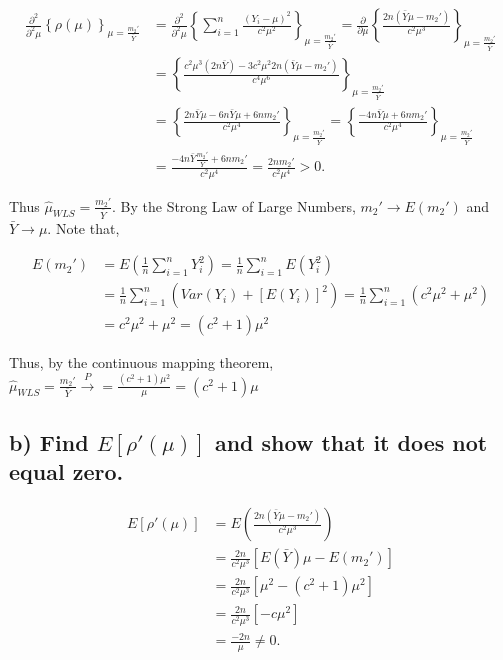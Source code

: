 \documentclass[
  letterpaper,
  DIV=11,
  numbers=noendperiod]{scrreprt}
\begin{document}
\[
\begin{aligned}
\frac{\partial^2}{\partial^2 \mu} \left\{\rho(\mu)\right\}_{\mu=\frac{m_2'}{\bar{Y}}} &= \frac{\partial^2 }{\partial^2 \mu} \left\{ \sum_{i=1}^n \frac{(Y_i- \mu)^2}{c^2\mu^2} \right\}_{\mu = \frac{m_2'}{\bar{Y}}} 
=\frac{\partial}{\partial \mu} \left\{ \frac{2n(\bar{Y}\mu -m_2')}{c^2\mu^3} \right\}_{\mu = \frac{m_2'}{\bar{Y}}} \\
&=\left\{ \frac{c^2\mu^3(2n\bar{Y})-3c^2\mu^2 2n(\bar{Y}\mu -m_2')}{c^4\mu^6} \right\}_{\mu = \frac{m_2'}{\bar{Y}}} \\
&=\left\{ \frac{2n\bar{Y}\mu-6n\bar{Y}\mu +6nm_2'}{c^2\mu^4} \right\}_{\mu = \frac{m_2'}{\bar{Y}}} 
=\left\{ \frac{-4n\bar{Y}\mu+6nm_2'}{c^2\mu^4} \right\}_{\mu = \frac{m_2'}{\bar{Y}}} \\
&=\frac{-4n\bar{Y}\frac{m_2'}{\bar{Y}}+6nm_2'}{c^2\mu^4} =\frac{2nm_2'}{c^2\mu^4}
> 0.
\end{aligned}
\]

Thus \(\hat{\mu}_{WLS} = \frac{m_2'}{\bar{Y}}\). By the Strong Law of
Large Numbers, \(m_2' \to E(m_2')\) and \(\bar{Y} \to \mu\). Note that,

\[
\begin{aligned}E(m_2') &= E\left(\frac{1}{n}\sum_{i=1}^n Y_i^2\right)=\frac{1}{n}\sum_{i=1}^nE\left( Y_i^2\right) \\ &=\frac{1}{n}\sum_{i=1}^n \left(Var(Y_i) +[E(Y_i)]^2 \right) =\frac{1}{n}\sum_{i=1}^n \left( c^2\mu^2+\mu^2 \right)\\
&=c^2\mu^2+\mu^2 = (c^2+1)\mu^2
\end{aligned}
\]

Thus, by the continuous mapping theorem,
\(\hat{\mu}_{WLS}= \frac{m_2'}{\bar{Y}} \overset{P}{\to} = \frac{(c^2+1)\mu^2}{\mu}=(c^2+1)\mu\)

\hypertarget{b-find-erho-mu-and-show-that-it-does-not-equal-zero.}{%
\subsection{\texorpdfstring{b) Find \(E[\rho ' (\mu)]\) and show that it
does not equal
zero.}{b) Find E{[}\textbackslash rho \textquotesingle{} (\textbackslash mu){]} and show that it does not equal zero.}}\label{b-find-erho-mu-and-show-that-it-does-not-equal-zero.}}

\[
\begin{aligned}
E[\rho ' (\mu)] &= E\left(\frac{2n(\bar{Y}\mu -m_2')}{c^2\mu^3} \right) \\
&= \frac{2n}{c^2\mu^3}\left[E(\bar{Y})\mu -E(m_2')\right] \\
&= \frac{2n}{c^2\mu^3}\left[\mu^2 -(c^2+1)\mu^2\right] \\
&= \frac{2n}{c^2\mu^3}\left[-c\mu^2\right] \\
&=\frac{-2n}{\mu} \neq 0.
\end{aligned}
\]
\end{document}
